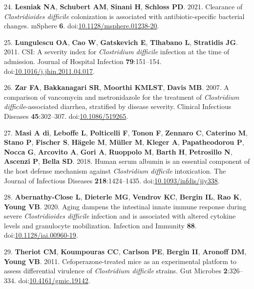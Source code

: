 \documentclass[
  12pt,
]{article}
\newenvironment{cslreferences}%
  {}%
  {\par}
\begin{document}
\begin{cslreferences}
\leavevmode\hypertarget{ref-Lesniak2021}{}%
24. \textbf{Lesniak NA}, \textbf{Schubert AM}, \textbf{Sinani H},
\textbf{Schloss PD}. 2021. Clearance of \emph{Clostridioides difficile}
colonization is associated with antibiotic-specific bacterial changes.
mSphere \textbf{6}.
doi:\href{https://doi.org/10.1128/msphere.01238-20}{10.1128/msphere.01238-20}.

\leavevmode\hypertarget{ref-Lungulescu2011}{}%
25. \textbf{Lungulescu OA}, \textbf{Cao W}, \textbf{Gatskevich E},
\textbf{Tlhabano L}, \textbf{Stratidis JG}. 2011. CSI: A severity index
for \emph{Clostridium difficile} infection at the time of admission.
Journal of Hospital Infection \textbf{79}:151--154.
doi:\href{https://doi.org/10.1016/j.jhin.2011.04.017}{10.1016/j.jhin.2011.04.017}.

\leavevmode\hypertarget{ref-Zar2007}{}%
26. \textbf{Zar FA}, \textbf{Bakkanagari SR}, \textbf{Moorthi KMLST},
\textbf{Davis MB}. 2007. A comparison of vancomycin and metronidazole
for the treatment of \emph{Clostridium difficile}-associated diarrhea,
stratified by disease severity. Clinical Infectious Diseases
\textbf{45}:302--307.
doi:\href{https://doi.org/10.1086/519265}{10.1086/519265}.

\leavevmode\hypertarget{ref-diMasi2018}{}%
27. \textbf{Masi A di}, \textbf{Leboffe L}, \textbf{Polticelli F},
\textbf{Tonon F}, \textbf{Zennaro C}, \textbf{Caterino M}, \textbf{Stano
P}, \textbf{Fischer S}, \textbf{Hägele M}, \textbf{Müller M},
\textbf{Kleger A}, \textbf{Papatheodorou P}, \textbf{Nocca G},
\textbf{Arcovito A}, \textbf{Gori A}, \textbf{Ruoppolo M}, \textbf{Barth
H}, \textbf{Petrosillo N}, \textbf{Ascenzi P}, \textbf{Bella SD}. 2018.
Human serum albumin is an essential component of the host defense
mechanism against \emph{Clostridium difficile} intoxication. The Journal
of Infectious Diseases \textbf{218}:1424--1435.
doi:\href{https://doi.org/10.1093/infdis/jiy338}{10.1093/infdis/jiy338}.

\leavevmode\hypertarget{ref-AbernathyClose2020}{}%
28. \textbf{Abernathy-Close L}, \textbf{Dieterle MG}, \textbf{Vendrov
KC}, \textbf{Bergin IL}, \textbf{Rao K}, \textbf{Young VB}. 2020. Aging
dampens the intestinal innate immune response during severe
\emph{Clostridioides difficile} infection and is associated with altered
cytokine levels and granulocyte mobilization. Infection and Immunity
\textbf{88}.
doi:\href{https://doi.org/10.1128/iai.00960-19}{10.1128/iai.00960-19}.

\leavevmode\hypertarget{ref-Theriot2011}{}%
29. \textbf{Theriot CM}, \textbf{Koumpouras CC}, \textbf{Carlson PE},
\textbf{Bergin II}, \textbf{Aronoff DM}, \textbf{Young VB}. 2011.
Cefoperazone-treated mice as an experimental platform to assess
differential virulence of \emph{Clostridium difficile} strains. Gut
Microbes \textbf{2}:326--334.
doi:\href{https://doi.org/10.4161/gmic.19142}{10.4161/gmic.19142}.


\end{cslreferences}
\end{document}

